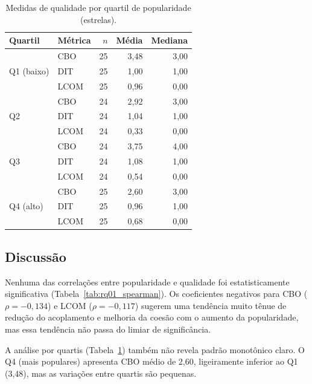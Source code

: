 \documentclass[12pt,a4paper]{article}
\begin{document}
\begin{table}[htbp]
\centering
\caption{Medidas de qualidade por quartil de popularidade (estrelas).}
\label{tab:rq01_quartis}
\small
\begin{tabular}{llrrr}
\toprule
\textbf{Quartil} & \textbf{Métrica} & \textbf{$n$} & \textbf{Média} & \textbf{Mediana} \\
\midrule
\multirow{3}{*}{Q1 (baixo)} & CBO & 25 & 3,48 & 3,00 \\
                             & DIT & 25 & 1,00 & 1,00 \\
                             & LCOM& 25 & 0,96 & 0,00 \\
\midrule
\multirow{3}{*}{Q2}          & CBO & 24 & 2,92 & 3,00 \\
                             & DIT & 24 & 1,04 & 1,00 \\
                             & LCOM& 24 & 0,33 & 0,00 \\
\midrule
\multirow{3}{*}{Q3}          & CBO & 24 & 3,75 & 4,00 \\
                             & DIT & 24 & 1,08 & 1,00 \\
                             & LCOM& 24 & 0,54 & 0,00 \\
\midrule
\multirow{3}{*}{Q4 (alto)}   & CBO & 25 & 2,60 & 3,00 \\
                             & DIT & 25 & 0,96 & 1,00 \\
                             & LCOM& 25 & 0,68 & 0,00 \\
\bottomrule
\end{tabular}
\end{table}

\subsection{Discussão}

Nenhuma das correlações entre popularidade e qualidade foi estatisticamente
significativa (Tabela~\ref{tab:rq01_spearman}). Os coeficientes negativos
para CBO ($\rho = -0{,}134$) e LCOM ($\rho = -0{,}117$) sugerem uma tendência
muito tênue de redução do acoplamento e melhoria da coesão com o aumento da
popularidade, mas essa tendência não passa do limiar de significância.

A análise por quartis (Tabela~\ref{tab:rq01_quartis}) também não revela
padrão monotônico claro. O Q4 (mais populares) apresenta CBO médio de 2,60,
ligeiramente inferior ao Q1 (3,48), mas as variações entre quartis são pequenas.
\end{document}
